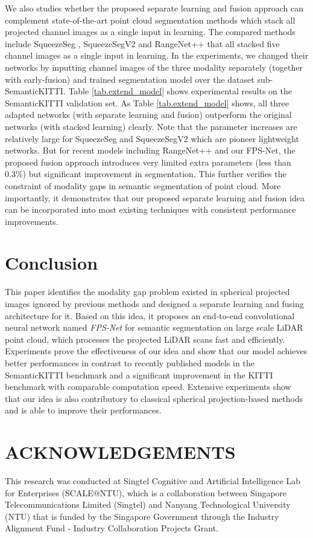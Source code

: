 \documentclass[preprint,review,3p]{elsarticle}
\begin{document}
We also studies whether the proposed separate learning and fusion approach can complement state-of-the-art point cloud segmentation methods which stack all projected channel images as a single input in learning. The compared methods include SqueezeSeg \cite{wu2018squeezeseg}, SqueezeSegV2 \cite{wu2019squeezesegv2} and RangeNet++ \cite{milioto2019rangenet++} that all stacked five channel images as a single input in learning. In the experiments, we changed their networks by inputting channel images of the three modality separately (together with early-fusion) and trained segmentation model over the dataset sub-SemanticKITTI. Table \ref{tab.extend_model} shows experimental results on the SemanticKITTI validation set. As Table \ref{tab.extend_model} shows, all three adapted networks (with separate learning and fusion) outperform the original networks (with stacked learning) clearly. 
Note that the parameter increases are relatively large for SqueezeSeg and SqueezeSegV2 which are pioneer lightweight networks. But for recent models including RangeNet++ and our FPS-Net, the proposed fusion approach introduces very limited extra parameters (less than 0.3\%) but significant improvement in segmentation. This further verifies the constraint of modality gaps in semantic segmentation of point cloud. More importantly, it demonstrates that our proposed separate learning and fusion idea can be incorporated into most existing techniques with consistent performance improvements.

\section{Conclusion}\label{Sec.conclusion}
This paper identifies the modality gap problem existed in spherical projected images ignored by previous methods and designed a separate learning and fusing architecture for it. Based on this idea, it proposes an end-to-end convolutional neural network named \textit{FPS-Net} for semantic segmentation on large scale LiDAR point cloud, which processes the projected LiDAR scans fast and efficiently. Experiments prove the effectiveness of our idea and show that our model achieves better performances in contrast to recently published models in the SemanticKITTI benchmark and a significant improvement in the KITTI benchmark with comparable computation speed. Extensive experiments show that our idea is also contributory to classical spherical projection-based methods and is able to improve their performances.

\section*{ACKNOWLEDGEMENTS}\label{ACKNOWLEDGEMENTS}
This research was conducted at Singtel Cognitive and Artificial Intelligence Lab for Enterprises (SCALE@NTU), which is a collaboration between Singapore Telecommunications Limited (Singtel) and Nanyang Technological University (NTU) that is funded by the Singapore Government through the Industry Alignment Fund ‐ Industry Collaboration Projects Grant.


\end{document}
